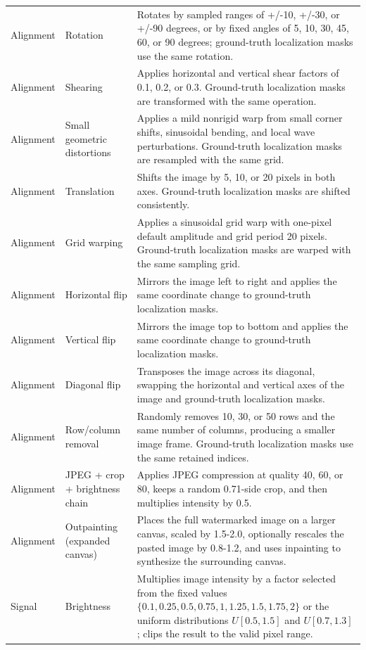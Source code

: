 {\begin{longtable}{@{}>{\raggedright\arraybackslash}p{} >{\raggedright\arraybackslash}p{} >{\raggedright\arraybackslash}p{}@{}}
Alignment & Rotation & Rotates by sampled ranges of +/-10, +/-30, or +/-90 degrees, or by fixed angles of 5, 10, 30, 45, 60, or 90 degrees; ground-truth localization masks use the same rotation. \\
Alignment & Shearing & Applies horizontal and vertical shear factors of 0.1, 0.2, or 0.3. Ground-truth localization masks are transformed with the same operation. \\
Alignment & Small geometric distortions & Applies a mild nonrigid warp from small corner shifts, sinusoidal bending, and local wave perturbations. Ground-truth localization masks are resampled with the same grid. \\
Alignment & Translation & Shifts the image by 5, 10, or 20 pixels in both axes. Ground-truth localization masks are shifted consistently. \\
Alignment & Grid warping & Applies a sinusoidal grid warp with one-pixel default amplitude and grid period 20 pixels. Ground-truth localization masks are warped with the same sampling grid. \\
Alignment & Horizontal flip & Mirrors the image left to right and applies the same coordinate change to ground-truth localization masks. \\
Alignment & Vertical flip & Mirrors the image top to bottom and applies the same coordinate change to ground-truth localization masks. \\
Alignment & Diagonal flip & Transposes the image across its diagonal, swapping the horizontal and vertical axes of the image and ground-truth localization masks. \\
Alignment & Row/column removal & Randomly removes 10, 30, or 50 rows and the same number of columns, producing a smaller image frame. Ground-truth localization masks use the same retained indices. \\
Alignment & JPEG + crop + brightness chain & Applies JPEG compression at quality 40, 60, or 80, keeps a random 0.71-side crop, and then multiplies intensity by 0.5. \\
Alignment & Outpainting (expanded canvas) & Places the full watermarked image on a larger canvas, scaled by 1.5-2.0, optionally rescales the pasted image by 0.8-1.2, and uses inpainting to synthesize the surrounding canvas. \\
\addlinespace[2pt]
Signal & Brightness & Multiplies image intensity by a factor selected from the fixed values \(\{0.1,0.25,0.5,0.75,1,1.25,1.5,1.75,2\}\) or the uniform distributions \(U[0.5,1.5]\) and \(U[0.7,1.3]\); clips the result to the valid pixel range. \\

\end{longtable}}
